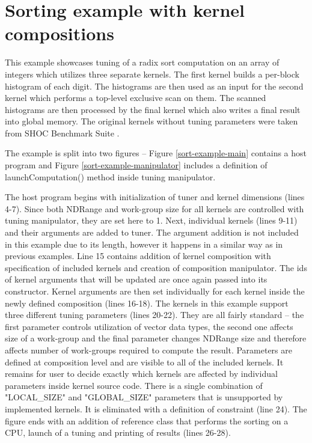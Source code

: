 \documentclass
[
    digital, %
    oneside, %
    table, %
    nolof, %
    nolot, %
    nocover %
]{fithesis3}
\begin{document}
\clearpage
\section{Sorting example with kernel compositions}
This example showcases tuning of a radix sort computation on an array of integers which utilizes three separate kernels. The first kernel builds
a per-block histogram of each digit. The histograms are then used as an input for the second kernel which performs a top-level exclusive scan on them.
The scanned histograms are then processed by the final kernel which also writes a final result into global memory. The original kernels without tuning
parameters were taken from SHOC Benchmark Suite \cite{shoc-kernel}.

The example is split into two figures -- Figure \ref{sort-example-main} contains a host program and Figure \ref{sort-example-manipulator} includes
a definition of launchComputation() method inside tuning manipulator.

The host program begins with initialization of tuner and kernel dimensions (lines 4-7). Since both NDRange and work-group size for all kernels are
controlled with tuning manipulator, they are set here to 1. Next, individual kernels (lines 9-11) and their arguments are added to tuner. The argument
addition is not included in this example due to its length, however it happens in a similar way as in previous examples. Line 15 contains addition of
kernel composition with specification of included kernels and creation of composition manipulator. The ids of kernel arguments that will be updated are
once again passed into its constructor. Kernel arguments are then set individually for each kernel inside the newly defined composition (lines 16-18).
The kernels in this example support three different tuning parameters (lines 20-22). They are all fairly standard -- the first parameter controls
utilization of vector data types, the second one affects size of a work-group and the final parameter changes NDRange size and therefore affects number
of work-groups required to compute the result. Parameters are defined at composition level and are visible to all of the included kernels. It remains
for user to decide exactly which kernels are affected by individual parameters inside kernel source code. There is a single combination of "LOCAL\_SIZE"
and "GLOBAL\_SIZE" parameters that is unsupported by implemented kernels. It is eliminated with a definition of constraint (line 24). The figure ends with
an addition of reference class that performs the sorting on a CPU, launch of a tuning and printing of results (lines 26-28).
\end{document}
